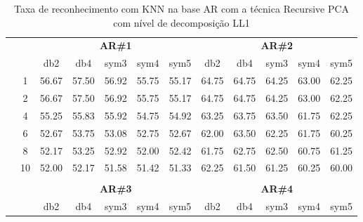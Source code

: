\begin{table}[H]
	\centering
    \normalsize
	\caption{Taxa de reconhecimento com KNN na base AR com a técnica Recursive PCA com nível de decomposição LL1}
	\begin{tabular}{|c|c|c c c c c|c c c c c|}
\cline{3-12}
\multicolumn{2}{c|}{\multirow{2}{*}{}} & \multicolumn{5}{c|}{\textbf{AR\#1}}  & \multicolumn{5}{c|}{\textbf{AR\#2}} \\\cline{3-12}

\multicolumn{2}{c|}{}  & db2 & db4 & sym3 & sym4 & sym5 & db2 & db4& sym3 & sym4 & sym5 \\\hline

\multicolumn{1}{|c|}{ \multirow{5}{*}{\rotatebox[origin=c]{90}{\textbf{K-vizinhos}}} }
&1	&56.67	&57.50	&56.92	&55.75	&55.17	&64.75	&64.75	&64.25	&63.00	&62.25	\\\cline{2-12}
&2	&56.67	&57.50	&56.92	&55.75	&55.17	&64.75	&64.75	&64.25	&63.00	&62.25	\\\cline{2-12}
&4	&55.25	&55.83	&55.92	&54.75	&54.92	&63.25	&63.75	&63.50	&61.75	&62.25	\\\cline{2-12}
&6	&52.67	&53.75	&53.08	&52.75	&52.67	&62.00	&63.50	&62.25	&61.75	&60.25	\\\cline{2-12}
&8	&52.17	&53.25	&52.92	&52.00	&52.42	&61.75	&62.75	&62.50	&60.75	&61.25	\\\cline{2-12}
&10	&52.00	&52.17	&51.58	&51.42	&51.33	&62.25	&61.50	&61.25	&60.25	&60.00	


\\ \midrule
\multicolumn{12}{c}{}\\ 




\cline{3-12}
\multicolumn{2}{c}{} & \multicolumn{5}{|c|}{\textbf{AR\#3}}  & \multicolumn{5}{c|}{\textbf{AR\#4}} \\\cline{3-12}
\multicolumn{2}{c}{}  & \multicolumn{1}{|c}{db2} & db4 & sym3 & sym4 & sym5 & db2 & db4& sym3 & sym4 & sym5 \\\hline


\end{tabular}
\end{table}
